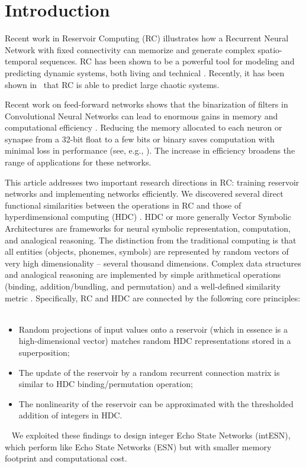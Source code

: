 \section{Introduction}
\label{sect:intro}




Recent work in Reservoir Computing \cite{RC09, Sussillo2009} (RC) illustrates how a Recurrent Neural Network with fixed connectivity can memorize and generate complex spatio-temporal sequences. RC has been shown to be a powerful tool for modeling and predicting dynamic systems, both living \cite{ESN11NIPS} and technical \cite{ESN04, RCnature11}. 
Recently, it has been shown in~\cite{CHAOS18} that RC is able to predict large chaotic systems. 


Recent work on feed-forward networks shows that the binarization of filters in Convolutional Neural Networks can lead to enormous gains in memory and computational efficiency \cite{ECCV16}. Reducing the memory allocated to each neuron or synapse from a 32-bit float to a few bits or binary saves computation with minimal loss in performance (see, e.g., \cite{BinNN, QuanNN}). The increase in efficiency broadens the range of applications for these networks. 

This article addresses two important research directions in RC: training reservoir networks and implementing networks efficiently. We discovered several direct functional similarities between the operations in RC and those of hyperdimensional computing (HDC) \cite{Frady17}. HDC \cite{Kanerva09} or more generally Vector Symbolic Architectures \cite{Gayler2003} are frameworks for neural symbolic representation, computation, and analogical reasoning. The distinction from the traditional computing is that all entities (objects, phonemes, symbols) are represented by random vectors of very high dimensionality -- several thousand dimensions. Complex data structures and analogical reasoning are implemented by simple arithmetical operations (binding, addition/bundling, and permutation) and a well-defined similarity metric \cite{Kanerva09}.
Specifically, RC and HDC are connected by the following core principles:
~
\begin{itemize}
  \item Random projections of input values onto a reservoir (which in essence is a high-dimensional vector) matches random HDC representations stored in a superposition; 
  \item The update of the reservoir by a random recurrent connection matrix is similar to HDC binding/permutation operation;
  \item The nonlinearity of the reservoir can be approximated with the thresholded addition of integers in HDC. 
\end{itemize}
~
We exploited these findings to design integer Echo State Networks (intESN), which perform like Echo State Networks (ESN) but with smaller memory footprint and computational cost. 

